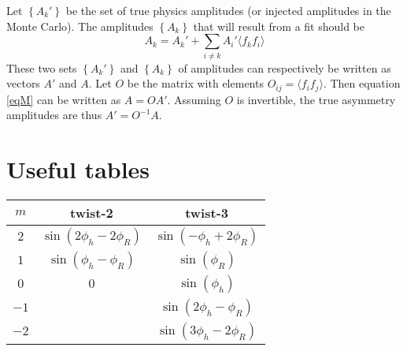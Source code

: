 \documentclass[12pt]{article}
\begin{document}
Let $\left\{A_k'\right\}$ be the set of true physics amplitudes (or injected
amplitudes in the Monte Carlo).  The amplitudes $\left\{A_k\right\}$ that will result
from a fit should be 
\begin{equation}
A_k=A_k'+\sum_{i\neq k}{A_i'\langle f_kf_i\rangle}
\label{eqM}
\end{equation}
These two sets $\left\{A_k'\right\}$ and $\left\{A_k\right\}$ of amplitudes can
respectively be written as vectors $A'$ and $A$. Let $O$ be the matrix with
elements $O_{ij}=\langle f_if_j\rangle$. Then equation \ref{eqM} can be written
as $A=OA'$. Assuming $O$ is invertible, the true asymmetry amplitudes are thus
$A'=O^{-1}A$.


\section*{Useful tables}
\begin{center}
\begin{tabular}{|c|c|c|}
\hline
$m$ & twist-2 & twist-3 \\\hline\hline
$2$ & $\sin\left(2\phi_h-2\phi_R\right)$ & $\sin\left(-\phi_h+2\phi_R\right)$ \\\hline
$1$ & $\sin\left(\phi_h-\phi_R\right)$ & $\sin\left(\phi_R\right)$ \\\hline
$0$ & $0$ & $\sin\left(\phi_h\right)$ \\\hline
$-1$ & $~$ & $\sin\left(2\phi_h-\phi_R\right)$ \\\hline
$-2$ & $~$ & $\sin\left(3\phi_h-2\phi_R\right)$ \\\hline
\end{tabular}
\end{center}
\end{document}
